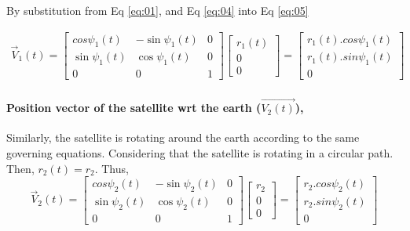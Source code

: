 \documentclass[11pt]{article}
\begin{document}
By substitution from Eq \ref{eq:01}, and Eq \ref{eq:04} into Eq \ref{eq:05}

\begin{gather}\label{eq:06}
\vec{V}_1(t) = \begin{bmatrix}
            cos{\psi_1(t)}  &  -\sin{\psi_1(t)}  &  0    \\
            \sin{\psi_1(t)}&   \cos{\psi_1(t)}    & 0\\
            0          &    0   & 1          
            \end{bmatrix}  \begin{bmatrix}
            r_1(t)   \\
            0 \\
             0             
            \end{bmatrix}  
            = \begin{bmatrix}
            r_1(t) . cos{\psi_1(t)}  \\
            r_1(t) . sin{\psi_1(t)} \\
             0             
            \end{bmatrix}
\end{gather}

\paragraph{Position vector of the satellite wrt the earth ($\vec{V_2(t)}$),}


Similarly, the satellite is rotating around the earth according to the same governing equations. Considering that the satellite is rotating in a circular path. Then, $r_2(t) = r_2$. Thus,
\begin{equation}
    \vec{V}_2(t) = \begin{bmatrix}
            cos{\psi_2(t)}  &  -\sin{\psi_2(t)}  &  0    \\
            \sin{\psi_2(t)}&   \cos{\psi_2(t)}    & 0\\
            0          &    0   & 1          
            \end{bmatrix}  \begin{bmatrix}
            r_2   \\
            0 \\
             0             
            \end{bmatrix}  
            = \begin{bmatrix}
            r_2 . cos{\psi_2(t)}  \\
            r_2 . sin{\psi_2(t)} \\
             0             
            \end{bmatrix}
\end{equation}
\end{document}
